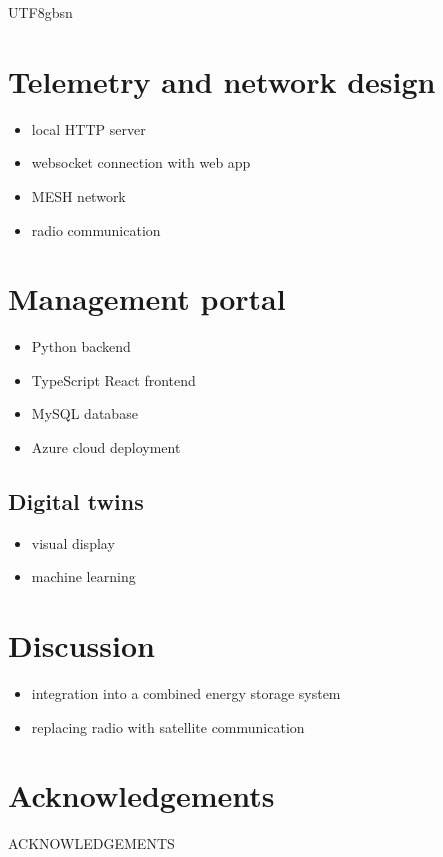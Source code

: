 \documentclass[10pt]{article}
\begin{document}
\begin{CJK}{UTF8}{gbsn}
\hypertarget{telemetry}{%
\section*{Telemetry and network design}}
{\label{sec:telemetry}}
\begin{itemize}
  \item local HTTP server
  \item websocket connection with web app
  \item MESH network
  \item radio communication
\end{itemize}

\hypertarget{portal}{%
\section*{Management portal}}
{\label{sec:portal}}
\begin{itemize}
  \item Python backend
  \item TypeScript React frontend
  \item MySQL database
  \item Azure cloud deployment
\end{itemize}
\hypertarget{twin}{%
\subsection*{Digital twins}}
{\label{sec:twin}}
\begin{itemize}
  \item visual display
  \item machine learning
\end{itemize}

\hypertarget{discussion}{%
\section*{Discussion}}
{\label{sec:discussion}}
\begin{itemize}
  \item integration into a combined energy storage system
  \item replacing radio with satellite communication
\end{itemize}

\hypertarget{acknowledgements}{%
\section*{Acknowledgements}}
{\label{sec:acknowledgements}}
ACKNOWLEDGEMENTS


\end{CJK}
\end{document}
